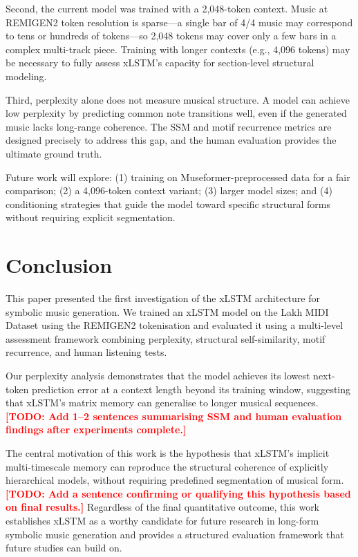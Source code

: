 \documentclass[conference]{IEEEtran}
\newcommand{\TODO}[1]{\textcolor{red}{\textbf{[TODO: #1]}}}
\begin{document}
Second, the current model was trained with a 2,048-token context. Music at
REMIGEN2 token resolution is sparse—a single bar of 4/4 music may
correspond to tens or hundreds of tokens—so 2,048 tokens may cover only
a few bars in a complex multi-track piece. Training with longer contexts
(e.g., 4,096 tokens) may be necessary to fully assess xLSTM's capacity
for section-level structural modeling.

Third, perplexity alone does not measure musical structure. A model can
achieve low perplexity by predicting common note transitions well, even
if the generated music lacks long-range coherence. The SSM and motif
recurrence metrics are designed precisely to address this gap, and the
human evaluation provides the ultimate ground truth.

Future work will explore: (1) training on Museformer-preprocessed data
for a fair comparison; (2) a 4,096-token context variant; (3) larger
model sizes; and (4) conditioning strategies that guide the model toward
specific structural forms without requiring explicit segmentation.

\section{Conclusion}
\label{sec:conclusion}

This paper presented the first investigation of the xLSTM architecture
for symbolic music generation. We trained an xLSTM model on the Lakh
MIDI Dataset using the REMIGEN2 tokenisation and evaluated it using a
multi-level assessment framework combining perplexity, structural
self-similarity, motif recurrence, and human listening tests.

Our perplexity analysis demonstrates that the model achieves its lowest
next-token prediction error at a context length beyond its training
window, suggesting that xLSTM's matrix memory can generalise to longer
musical sequences. \TODO{Add 1--2 sentences summarising SSM and human
evaluation findings after experiments complete.}

The central motivation of this work is the hypothesis that xLSTM's
implicit multi-timescale memory can reproduce the structural coherence
of explicitly hierarchical models, without requiring predefined
segmentation of musical form. \TODO{Add a sentence confirming or
qualifying this hypothesis based on final results.} Regardless of the
final quantitative outcome, this work establishes xLSTM as a worthy
candidate for future research in long-form symbolic music generation and
provides a structured evaluation framework that future studies can build on.
\end{document}
